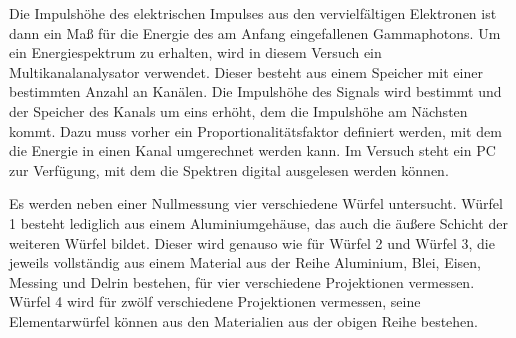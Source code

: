 Die Impulshöhe des elektrischen Impulses aus den vervielfältigen Elektronen ist dann ein Maß für die Energie des am Anfang eingefallenen Gammaphotons. Um ein Energiespektrum zu erhalten, wird in diesem Versuch ein Multikanalanalysator verwendet. Dieser besteht aus einem Speicher mit einer bestimmten Anzahl an Kanälen. Die Impulshöhe des Signals wird bestimmt und der Speicher des Kanals um eins erhöht, dem die Impulshöhe am Nächsten kommt. Dazu muss vorher ein Proportionalitätsfaktor definiert werden, mit dem die Energie in einen Kanal umgerechnet werden kann.
Im Versuch steht ein PC zur Verfügung, mit dem die Spektren digital ausgelesen werden können.

Es werden neben einer Nullmessung vier verschiedene Würfel untersucht. Würfel 1 besteht lediglich aus einem Aluminiumgehäuse, das auch die äußere Schicht der weiteren Würfel bildet. Dieser wird genauso wie für Würfel 2 und Würfel 3, die jeweils vollständig aus einem Material aus der Reihe Aluminium, Blei, Eisen, Messing und Delrin bestehen, für vier verschiedene Projektionen vermessen. Würfel 4 wird für zwölf verschiedene Projektionen vermessen, seine Elementarwürfel können aus den Materialien aus der obigen Reihe bestehen.
\cite{Messdauern einfügen!}
